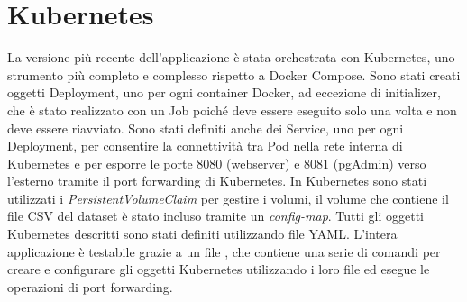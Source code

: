 \documentclass[12pt,a4paper]{report}
\begin{document}
\section{Kubernetes}

La versione più recente dell'applicazione è stata orchestrata con
Kubernetes, uno strumento più completo e complesso
rispetto a Docker Compose. Sono stati creati oggetti Deployment,
uno per ogni container Docker, ad eccezione di initializer,
che è stato realizzato con un Job poiché deve essere eseguito
solo una volta e non deve essere riavviato.
Sono stati definiti anche dei Service,
uno per ogni Deployment, per consentire
la connettività tra Pod nella rete interna di Kubernetes
e per esporre le porte $8080$ (webserver)
e $8081$ (pgAdmin) verso l'esterno
tramite il port forwarding di Kubernetes.
In Kubernetes sono stati utilizzati i \emph{PersistentVolumeClaim}
per gestire i volumi,
il volume che contiene il file CSV del dataset è stato incluso tramite
un \emph{config-map}.
Tutti gli oggetti Kubernetes descritti sono stati definiti
utilizzando file YAML.
L'intera applicazione è testabile grazie a un file ,
che contiene una serie di comandi per creare e configurare gli
oggetti Kubernetes utilizzando i loro file
ed esegue le operazioni di port forwarding.



\cleardoublepage{} %
\end{document}
